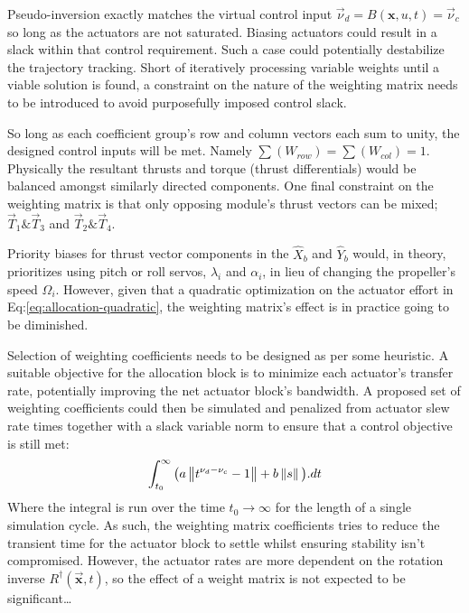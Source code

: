 \par
Pseudo-inversion exactly matches the virtual control input $\vec{\nu}_d=B(\mathbf{x},u,t)=\vec{\nu}_c$ so long as the actuators are not saturated. Biasing actuators could result in a slack within that control requirement. Such a case could potentially destabilize the trajectory tracking. Short of iteratively processing variable weights until a viable solution is found, a constraint on the nature of the weighting matrix needs to be introduced to avoid purposefully imposed control slack.
\par
So long as each coefficient group's row and column vectors each sum to unity, the designed control inputs will be met. Namely $\sum (W_{row})=\sum (W_{col}) = 1$. Physically the resultant thrusts and torque (thrust differentials) would be balanced amongst similarly directed components. One final constraint on the weighting matrix is that only opposing module's thrust vectors can be mixed; $\vec{T}_1\text{\&}\vec{T}_3$ and $\vec{T}_2\text{\&}\vec{T}_4$.
\par
Priority biases for thrust vector components in the $\hat{X}_{b}$ and $\hat{Y}_{b}$ would, in theory, prioritizes using pitch or roll servos, $\lambda_i$ and $\alpha_i$, in lieu of changing the propeller's speed $\Omega_i$. However, given that a quadratic optimization on the actuator effort in Eq:\ref{eq:allocation-quadratic}, the weighting matrix's effect is in practice going to be diminished.
\par
Selection of weighting coefficients needs to be designed as per some heuristic. A suitable objective for the allocation block is to minimize each actuator's transfer rate, potentially improving the net actuator block's bandwidth. A proposed set of weighting coefficients could then be simulated and penalized from actuator slew rate times together with a slack variable norm to ensure that a control objective is still met:
\begin{equation}\label{eq:actuator-penalty}
\int_{t_0}^{\infty} \big(a\left\lVert t^{\nu_d-\nu_c}-1\right\rVert+b\left\lVert s\right\rVert\big).dt
\end{equation}
Where the integral is run over the time $t_0\rightarrow\infty$ for the length of a single simulation cycle. As such, the weighting matrix coefficients tries to reduce the transient time for the actuator block to settle whilst ensuring stability isn't compromised. However, the actuator rates are more dependent on the rotation inverse $R^\dagger(\vec{\mathbf{x}},t)$, so the effect of a weight matrix is not expected to be significant\ldots